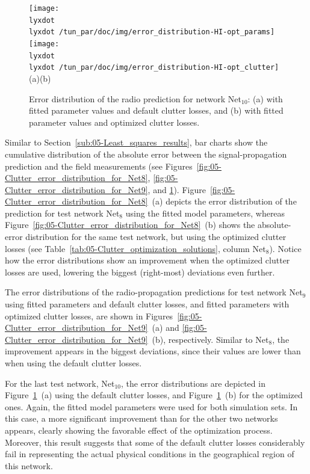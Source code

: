 \begin{figure}
\centering

\texttt{[image: \\lyxdot \\lyxdot /tun\_par/doc/img/error\_distribution-HI-opt\_params]}\texttt{[image: \\lyxdot \\lyxdot /tun\_par/doc/img/error\_distribution-HI-opt\_clutter]}\\\hspace*{0.2in}(a)\hspace*{3.2in}(b)

\caption{Error distribution of the radio prediction for network Net$_{10}$:
(a) with fitted parameter values and default clutter losses, and (b)
with fitted parameter values and optimized clutter losses.\label{fig:05-Clutter_error_distribution_for_Net10}}
\end{figure}


\bigskip{}


Similar to Section~\ref{sub:05-Least_squares_results}, bar charts
show the cumulative distribution of the absolute error between the
signal-propagation prediction and the field measurements (see Figures~\ref{fig:05-Clutter_error_distribution_for_Net8},
\ref{fig:05-Clutter_error_distribution_for_Net9}, and \ref{fig:05-Clutter_error_distribution_for_Net10}).
Figure~\ref{fig:05-Clutter_error_distribution_for_Net8}~(a) depicts
the error distribution of the prediction for test network Net$_{8}$
using the fitted model parameters, whereas Figure~\ref{fig:05-Clutter_error_distribution_for_Net8}~(b)
shows the absolute-error distribution for the same test network, but
using the optimized clutter losses (see Table~\ref{tab:05-Clutter_optimization_solutions},
column Net$_{8}$). Notice how the error distributions show an improvement
when the optimized clutter losses are used, lowering the biggest (right-most)
deviations even further.

The error distributions of the radio-propagation predictions for test
network Net$_{9}$ using fitted parameters and default clutter losses,
and fitted parameters with optimized clutter losses, are shown in
Figures~\ref{fig:05-Clutter_error_distribution_for_Net9}~(a) and
\ref{fig:05-Clutter_error_distribution_for_Net9}~(b), respectively.
Similar to Net$_{8}$, the improvement appears in the biggest deviations,
since their values are lower than when using the default clutter losses.

For the last test network, Net$_{10}$, the error distributions are
depicted in Figure~\ref{fig:05-Clutter_error_distribution_for_Net10}~(a)
using the default clutter losses, and Figure~\ref{fig:05-Clutter_error_distribution_for_Net10}~(b)
for the optimized ones. Again, the fitted model parameters were used
for both simulation sets. In this case, a more significant improvement
than for the other two networks appears, clearly showing the favorable
effect of the optimization process. Moreover, this result suggests
that some of the default clutter losses considerably fail in representing
the actual physical conditions in the geographical region of this
network.

